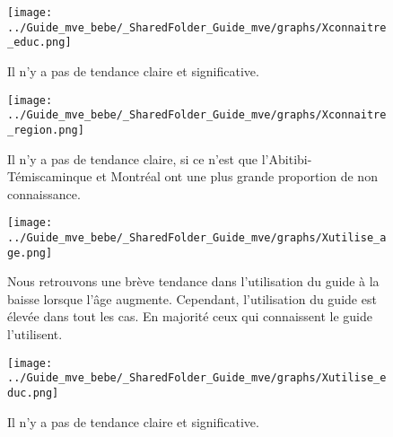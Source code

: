 \documentclass[
]{article}
\begin{document}
\begin{figure}[htbp]
  \centering
  \begin{minipage}{0.8\textwidth}
    \texttt{[image: ../Guide\_mve\_bebe/\_SharedFolder\_Guide\_mve/graphs/Xconnaitre\_educ.png]}
  \end{minipage}%
  \begin{minipage}{0.2\textwidth}
    \textbf{} Il n'y a pas de tendance claire et significative.
  \end{minipage}
\end{figure}

\begin{figure}[htbp]
  \centering
  \begin{minipage}{0.9\textwidth}
    \texttt{[image: ../Guide\_mve\_bebe/\_SharedFolder\_Guide\_mve/graphs/Xconnaitre\_region.png]}
  \end{minipage}%
  \begin{minipage}{0.1\textwidth}
    \textbf{} Il n'y a pas de tendance claire, si ce n'est que l'Abitibi-Témiscaminque et Montréal ont une plus grande proportion de non connaissance.
  \end{minipage}
\end{figure}

\begin{figure}[htbp]
  \centering
  \begin{minipage}{0.7\textwidth}
    \texttt{[image: ../Guide\_mve\_bebe/\_SharedFolder\_Guide\_mve/graphs/Xutilise\_age.png]}
  \end{minipage}%
  \begin{minipage}{0.3\textwidth}
    \textbf{} Nous retrouvons une brève tendance dans l'utilisation du guide à la baisse lorsque l'âge augmente. Cependant, l'utilisation du guide est élevée dans tout les cas. En majorité ceux qui connaissent le guide l'utilisent.
  \end{minipage}
\end{figure}

\begin{figure}[htbp]
  \centering
  \begin{minipage}{0.8\textwidth}
    \texttt{[image: ../Guide\_mve\_bebe/\_SharedFolder\_Guide\_mve/graphs/Xutilise\_educ.png]}
  \end{minipage}%
  \begin{minipage}{0.2\textwidth}
    \textbf{} Il n'y a pas de tendance claire et significative.
  \end{minipage}
\end{figure}
\end{document}
